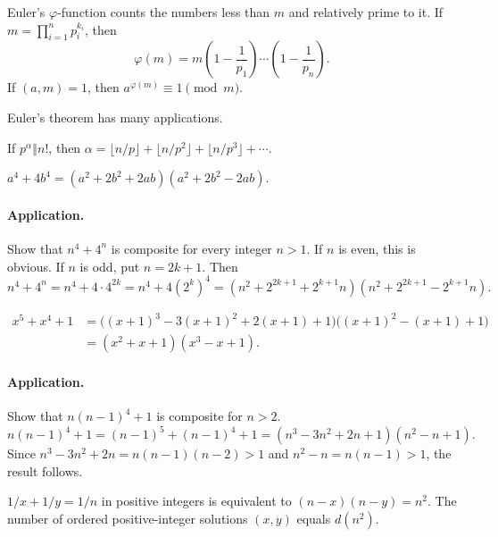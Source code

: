 \documentclass[11pt,a4paper]{article}
\begin{document}

\setcounter{theorem}{7}\begin{lemma}
Euler's $\varphi$-function counts the numbers less than $m$ and relatively prime to it.
If $m=\prod_{i=1}^n p_i^{k_i}$, then
\[
\varphi(m)=m\left(1-\frac1{p_1}\right)\cdots\left(1-\frac1{p_n}\right).
\]
If $(a,m)=1$, then $a^{\varphi(m)}\equiv1\pmod m$.
\end{lemma}
Euler's theorem has many applications.

\setcounter{theorem}{8}\begin{lemma}
If $p^\alpha\mathbin\Vert n!$, then
$\alpha=\lfloor n/p\rfloor+\lfloor n/p^2\rfloor+\lfloor n/p^3\rfloor+\cdots$.
\end{lemma}

\setcounter{theorem}{9}\begin{lemma}
$a^4+4b^4=(a^2+2b^2+2ab)(a^2+2b^2-2ab)$.
\end{lemma}
\paragraph{Application.}
Show that $n^4+4^n$ is composite for every integer $n>1$. If $n$ is even, this is obvious.
If $n$ is odd, put $n=2k+1$. Then
\[
n^4+4^n=n^4+4\cdot4^{2k}=n^4+4(2^k)^4
=(n^2+2^{2k+1}+2^{k+1}n)(n^2+2^{2k+1}-2^{k+1}n).
\]

\setcounter{theorem}{10}\begin{lemma}
\begin{align*}
x^5+x^4+1
&=\bigl((x+1)^3-3(x+1)^2+2(x+1)+1\bigr)
  \bigl((x+1)^2-(x+1)+1\bigr)\\
&=(x^2+x+1)(x^3-x+1).
\end{align*}
\end{lemma}
\paragraph{Application.}
Show that $n(n-1)^4+1$ is composite for $n>2$.
\[
n(n-1)^4+1=(n-1)^5+(n-1)^4+1
=(n^3-3n^2+2n+1)(n^2-n+1).
\]
Since $n^3-3n^2+2n=n(n-1)(n-2)>1$ and $n^2-n=n(n-1)>1$, the result follows.

\setcounter{theorem}{11}\begin{lemma}
$1/x+1/y=1/n$ in positive integers is equivalent to
$(n-x)(n-y)=n^2$. The number of ordered positive-integer solutions $(x,y)$
equals $d(n^2)$.
\end{lemma}
\end{document}
